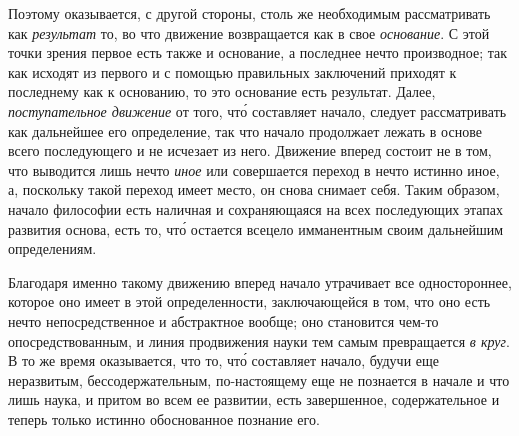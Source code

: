 Поэтому оказывается, с другой стороны, столь же необходимым
рассматривать как \emph{результат} то, во что движение
возвращается как в свое \emph{основание}. С этой точки
зрения первое есть также и основание, а последнее нечто
производное; так как исходят из первого и с помощью
правильных заключений приходят к последнему как
к основанию, то это основание есть результат. Далее,
\emph{поступательное движение} от того, чт\'о составляет начало,
следует рассматривать как дальнейшее его определение,
так что начало продолжает лежать в основе всего последующего
и не исчезает из него. Движение вперед состоит
не в том, что выводится лишь нечто \emph{иное} или совершается
переход в нечто истинно иное, а, поскольку такой переход
имеет место, он снова снимает себя. Таким образом,
начало философии есть наличная и сохраняющаяся
на всех последующих этапах развития основа, есть то,
чт\'о остается всецело имманентным своим дальнейшим
определениям.

Благодаря именно такому движению вперед начало
утрачивает все одностороннее, которое оно имеет в этой
определенности, заключающейся в том, что оно есть нечто
непосредственное и абстрактное вообще; оно становится
чем-то опосредствованным, и линия продвижения
науки тем самым превращается \emph{в круг}. В то же время
оказывается, что то, чт\'о составляет начало, будучи еще
неразвитым, бессодержательным, по-настоящему еще не
познается в начале и что лишь наука, и притом во всем
ее развитии, есть завершенное, содержательное и теперь
только истинно обоснованное познание его.

